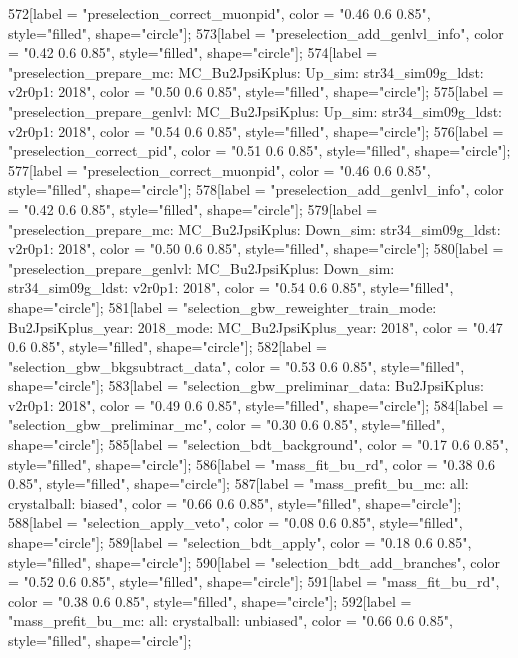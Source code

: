 {	572[label = "preselection_correct_muonpid", color = "0.46 0.6 0.85", style="filled", shape="circle"];
	573[label = "preselection_add_genlvl_info", color = "0.42 0.6 0.85", style="filled", shape="circle"];
	574[label = "preselection_prepare_mc\nmode: MC_Bu2JpsiKplus\npolarity: Up\nstrip_sim: str34_sim09g_ldst\nversion: v2r0p1\nyear: 2018", color = "0.50 0.6 0.85", style="filled", shape="circle"];
	575[label = "preselection_prepare_genlvl\nmode: MC_Bu2JpsiKplus\npolarity: Up\nstrip_sim: str34_sim09g_ldst\nversion: v2r0p1\nyear: 2018", color = "0.54 0.6 0.85", style="filled", shape="circle"];
	576[label = "preselection_correct_pid", color = "0.51 0.6 0.85", style="filled", shape="circle"];
	577[label = "preselection_correct_muonpid", color = "0.46 0.6 0.85", style="filled", shape="circle"];
	578[label = "preselection_add_genlvl_info", color = "0.42 0.6 0.85", style="filled", shape="circle"];
	579[label = "preselection_prepare_mc\nmode: MC_Bu2JpsiKplus\npolarity: Down\nstrip_sim: str34_sim09g_ldst\nversion: v2r0p1\nyear: 2018", color = "0.50 0.6 0.85", style="filled", shape="circle"];
	580[label = "preselection_prepare_genlvl\nmode: MC_Bu2JpsiKplus\npolarity: Down\nstrip_sim: str34_sim09g_ldst\nversion: v2r0p1\nyear: 2018", color = "0.54 0.6 0.85", style="filled", shape="circle"];
	581[label = "selection_gbw_reweighter_train\ndata_mode: Bu2JpsiKplus\ndata_year: 2018\nmc_mode: MC_Bu2JpsiKplus\nmc_year: 2018", color = "0.47 0.6 0.85", style="filled", shape="circle"];
	582[label = "selection_gbw_bkgsubtract_data", color = "0.53 0.6 0.85", style="filled", shape="circle"];
	583[label = "selection_gbw_preliminar_data\nmode: Bu2JpsiKplus\nversion: v2r0p1\nyear: 2018", color = "0.49 0.6 0.85", style="filled", shape="circle"];
	584[label = "selection_gbw_preliminar_mc", color = "0.30 0.6 0.85", style="filled", shape="circle"];
	585[label = "selection_bdt_background", color = "0.17 0.6 0.85", style="filled", shape="circle"];
	586[label = "mass_fit_bu_rd", color = "0.38 0.6 0.85", style="filled", shape="circle"];
	587[label = "mass_prefit_bu_mc\nmassbin: all\nmassmodel: crystalball\ntrigger: biased", color = "0.66 0.6 0.85", style="filled", shape="circle"];
	588[label = "selection_apply_veto", color = "0.08 0.6 0.85", style="filled", shape="circle"];
	589[label = "selection_bdt_apply", color = "0.18 0.6 0.85", style="filled", shape="circle"];
	590[label = "selection_bdt_add_branches", color = "0.52 0.6 0.85", style="filled", shape="circle"];
	591[label = "mass_fit_bu_rd", color = "0.38 0.6 0.85", style="filled", shape="circle"];
	592[label = "mass_prefit_bu_mc\nmassbin: all\nmassmodel: crystalball\ntrigger: unbiased", color = "0.66 0.6 0.85", style="filled", shape="circle"];
}

